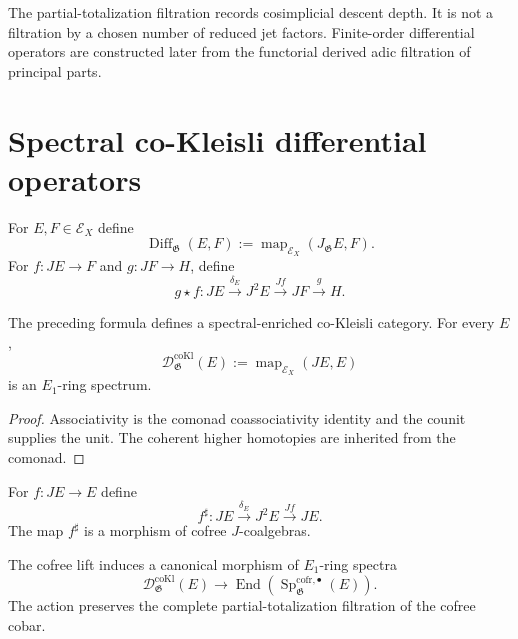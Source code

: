 \begin{remark}
The partial-totalization filtration records cosimplicial descent depth.  It is
not a filtration by a chosen number of reduced jet factors.  Finite-order
differential operators are constructed later from the functorial derived
adic filtration of principal parts.
\end{remark}

\section{Spectral co-Kleisli differential operators}
\label{sec:as-differential-operators}

\begin{definition}
\label{def:as-diff-operators}
For $E,F\in\mathcal E_X$ define
\[
\boxed{
    \operatorname{Diff}_{\mathfrak G}(E,F)
    :=
    \operatorname{map}_{\mathcal E_X}
    (J_{\mathfrak G}E,F).
}
\]
For
$f:JE\to F$ and $g:JF\to H$, define
\[
    g\star f:
    JE
    \xrightarrow{\delta_E}
    J^2E
    \xrightarrow{Jf}
    JF
    \xrightarrow{g}
    H.
\]
\end{definition}

\begin{proposition}
\label{prop:as-cokleisli}
The preceding formula defines a spectral-enriched co-Kleisli category.
For every $E$,
\[
\boxed{
    \mathcal D^{\mathrm{coKl}}_{\mathfrak G}(E)
    :=
    \operatorname{map}_{\mathcal E_X}(JE,E)
}
\]
is an $E_1$-ring spectrum.
\end{proposition}

\begin{proof}
Associativity is the comonad coassociativity identity and the counit supplies
the unit.  The coherent higher homotopies are inherited from the comonad.
\end{proof}

\begin{construction}
\label{con:as-cofree-operator-lift}
For $f:JE\to E$ define
\[
\boxed{
    f^\sharp:
    JE
    \xrightarrow{\delta_E}
    J^2E
    \xrightarrow{Jf}
    JE.
}
\]
The map $f^\sharp$ is a morphism of cofree $J$-coalgebras.
\end{construction}

\begin{theorem}
\label{thm:as-universal-spencer-action}
The cofree lift induces a canonical morphism of $E_1$-ring spectra
\[
\boxed{
    \mathcal D^{\mathrm{coKl}}_{\mathfrak G}(E)
    \longrightarrow
    \operatorname{End}
    \left(
        \operatorname{Sp}^{\mathrm{cofr},\bullet}_{\mathfrak G}(E)
    \right).
}
\]
The action preserves the complete partial-totalization filtration of the
cofree cobar.
\end{theorem}

